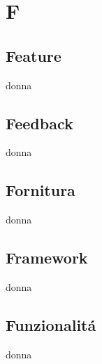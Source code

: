 \section{F} 
\subsection{Feature} 
donna
\subsection{Feedback} 
donna
\subsection{Fornitura} 
donna
\subsection{Framework} 
donna
\subsection{Funzionalitá} 
donna
